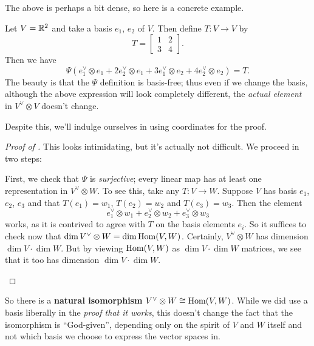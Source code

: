 The above is perhaps a bit dense, so here is a concrete example.
\begin{example}
	Let $V = \mathbb R^2$ and take a basis $e_1$, $e_2$ of $V$.
	Then define $T : V \to V$ by
	\[ T = \begin{bmatrix}
			1 & 2 \\ 3 & 4
		\end{bmatrix}. \]
	Then we have
	\[ \Psi(e_1^\vee \otimes e_1 + 2e_2^\vee \otimes e_1
		+ 3e_1^\vee \otimes e_2 + 4e_2^\vee \otimes e_2) = T. \]
	The beauty is that the $\Psi$ definition is basis-free;
	thus even if we change the basis,
	although the above expression will look completely different,
	the \emph{actual element} in $V^\vee \otimes V$ doesn't change.
\end{example}

Despite this, we'll indulge ourselves in using coordinates for the proof.
\begin{proof}
	[Proof of ]
	This looks intimidating, but it's actually not difficult.
	We proceed in two steps:
	\begin{enumerate}
		\ii First, we check that $\Psi$ is \emph{surjective};
		every linear map has at least one representation in $V^\vee \otimes W$.
		To see this, take any $T : V \to W$.
		Suppose $V$ has basis $e_1$, $e_2$, $e_3$ and that
		$T(e_1) = w_1$, $T(e_2) = w_2$ and $T(e_3) = w_3$.
		Then the element
		\[ e_1^\vee \otimes w_1 + e_2^\vee \otimes w_2 + e_3^\vee \otimes w_3 \]
		works, as it is contrived to agree with $T$ on the basis elements $e_i$.
		\ii So it suffices to check now that $\dim V^\vee \otimes W = \dim \operatorname{Hom}(V,W)$.
		Certainly, $V^\vee \otimes W$ has dimension $\dim V \cdot \dim W$.
		But by viewing $\operatorname{Hom}(V,W)$ as $\dim V \cdot \dim W$ matrices, we see that
		it too has dimension $\dim V \cdot \dim W$. \qedhere
	\end{enumerate}
\end{proof}
So there is a \textbf{natural isomorphism} $V^\vee \otimes W \cong \operatorname{Hom}(V,W)$.
While we did use a basis liberally in the
\emph{proof that it works}, this doesn't change the
fact that the isomorphism is ``God-given'',
depending only on the spirit of $V$ and $W$ itself
and not which basis we choose to express the vector spaces in.


